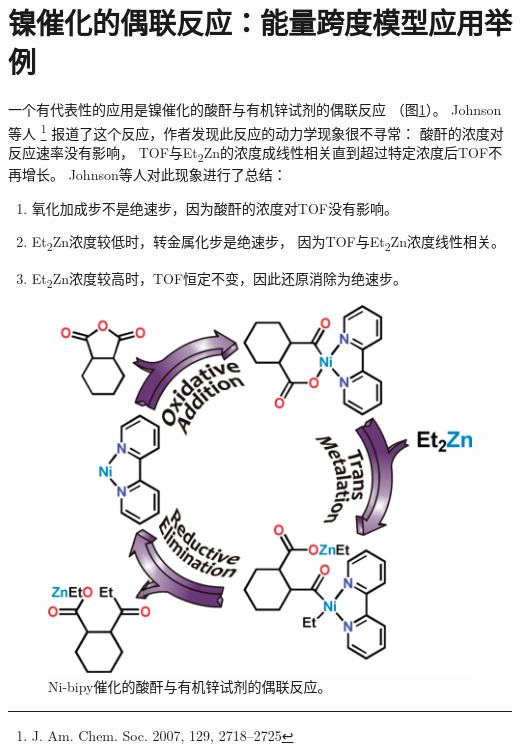 \documentclass[a4paper,titlepage]{article}
\begin{document}
\section*{镍催化的偶联反应：能量跨度模型应用举例}
一个有代表性的应用是镍催化的酸酐与有机锌试剂的偶联反应
（图\ref{fig:Ni-bipy_anhydride_Zn}）。
Johnson等人
\footnote{J. Am. Chem. Soc. 2007, 129, 2718–2725}
报道了这个反应，作者发现此反应的动力学现象很不寻常：
酸酐的浓度对反应速率没有影响，
TOF与Et\textsubscript{2}Zn的浓度成线性相关直到超过特定浓度后TOF不再增长。
Johnson等人对此现象进行了总结：
\begin{enumerate}
  \item 氧化加成步不是绝速步，因为酸酐的浓度对TOF没有影响。
  \item Et\textsubscript{2}Zn浓度较低时，转金属化步是绝速步，
        因为TOF与Et\textsubscript{2}Zn浓度线性相关。
  \item Et\textsubscript{2}Zn浓度较高时，TOF恒定不变，因此还原消除为绝速步。
\end{enumerate}
\begin{figure}[H]  %
  \centering
  \includegraphics[scale=0.5]{fig4}
  \caption{Ni-bipy催化的酸酐与有机锌试剂的偶联反应。}
  \label{fig:Ni-bipy_anhydride_Zn}  %
\end{figure}
\end{document}
